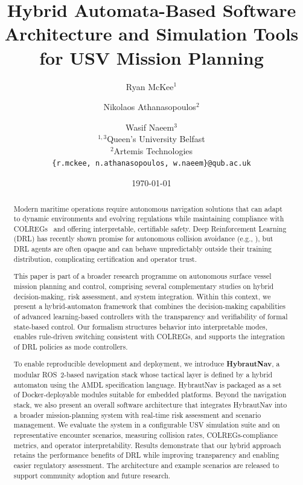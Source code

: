 \documentclass{article}
\title{Hybrid Automata-Based Software Architecture and Simulation Tools for USV Mission Planning}
\author{
    Ryan McKee$^{1}$ \and Nikolaos Athanasopoulos$^{2}$ \and Wasif Naeem$^{3}$ \\
    \small $^{1,3}$Queen's University Belfast \\
    \small $^{2}$Artemis Technologies \\
    \small \texttt{\{r.mckee,  n.athanasopoulos, w.naeem\}@qub.ac.uk}
}
\date{\today}
\begin{document}
\maketitle

\begin{abstract}
Modern maritime operations require autonomous navigation solutions that can adapt to dynamic environments and evolving regulations while maintaining compliance with COLREGs~\cite{colregs1972} and offering interpretable, certifiable safety. Deep Reinforcement Learning (DRL) has recently shown promise for autonomous collision avoidance (e.g., \cite{wang2022colregs}), but DRL agents are often opaque and can behave unpredictably outside their training distribution, complicating certification and operator trust.

This paper is part of a broader research programme on autonomous surface vessel mission planning and control, comprising several complementary studies on hybrid decision-making, risk assessment, and system integration. Within this context, we present a hybrid-automaton framework that combines the decision-making capabilities of advanced learning-based controllers with the transparency and verifiability of formal state-based control. Our formalism structures behavior into interpretable modes, enables rule-driven switching consistent with COLREGs, and supports the integration of DRL policies as mode controllers.

To enable reproducible development and deployment, we introduce \textbf{HybrautNav}, a modular ROS~2-based navigation stack whose tactical layer is defined by a hybrid automaton using the AMDL specification language. HybrautNav is packaged as a set of Docker-deployable modules suitable for embedded platforms. Beyond the navigation stack, we also present an overall software architecture that integrates HybrautNav into a broader mission-planning system with real-time risk assessment and scenario management. We evaluate the system in a configurable USV simulation suite and on representative encounter scenarios, measuring collision rates, COLREGs-compliance metrics, and operator interpretability. Results demonstrate that our hybrid approach retains the performance benefits of DRL while improving transparency and enabling easier regulatory assessment. The architecture and example scenarios are released to support community adoption and future research.
\end{abstract}
\end{document}
